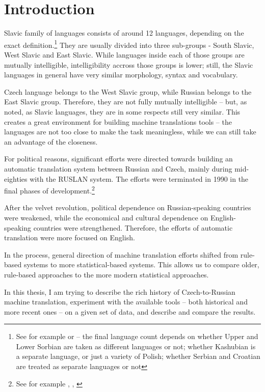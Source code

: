 \chapter*{Introduction}
Slavic  family of languages consists of around 12 languages, de\-pen\-ding on the exact definition.\footnote{See for example \cite{sussex2011slavic} or \cite{siewierska1998overview} --  the final language count depends on whether Upper and Lower Sorbian are taken as different languages or not; whether Kashubian is a separate language, or just a variety of Polish; whether Serbian and Croatian are treated as separate languages or not}
They are usually divided into three sub-groups - South Slavic, West Slavic and East Slavic. While languages inside each of those groups are mutually intelligible, intelligibility accross those groups is lower; still, the Slavic languages in general have very similar morphology, syntax and vocabulary.

Czech language belongs to the West Slavic group, while Russian belongs to the East Slavic group.  Therefore, they are not fully mutually intelligible -- but, as noted, as Slavic languages, they are in some respects still very similar. 
This creates a great environment for building machine translations tools -- the languages are not too close to make the task meaningless, while we can still take an advantage of the closeness.

For political reasons, significant efforts were directed towards building an automatic translation system between Russian and Czech, mainly during mid-eighties with the RUSLAN system. The efforts were terminated in 1990 in the final phases of development.\footnote{See for example \cite{recycled}, \cite{hajic1987}, \cite{olivaruslan}} 

After the velvet revolution, political dependence on Russian-speaking countries were weakened, while the economical and cultural dependence on English-speaking countries were strengthened. Therefore, the efforts of automatic translation were more focused on English. 

In the process, general direction of machine translation efforts shifted from rule-based systems to more statistical-based systems. This allows us to compare older, rule-based approaches to the more modern statistical approaches.

In this thesis, I am trying to describe the rich history of Czech-to-Russian machine translation, experiment with the available tools -- both historical and more recent ones -- on a given set of data, and describe and compare the results.
